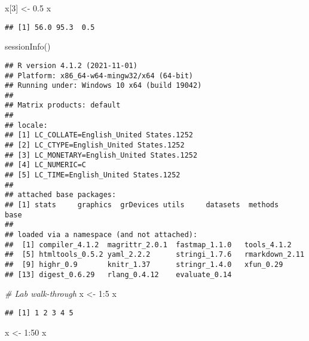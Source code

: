 \documentclass[
]{article}
\newenvironment{Shaded}{\begin{snugshade}}{\end{snugshade}}
\newcommand{\CommentTok}[1]{\textcolor[rgb]{0.56,0.35,0.01}{\textit{#1}}}
\newcommand{\DecValTok}[1]{\textcolor[rgb]{0.00,0.00,0.81}{#1}}
\newcommand{\FloatTok}[1]{\textcolor[rgb]{0.00,0.00,0.81}{#1}}
\newcommand{\FunctionTok}[1]{\textcolor[rgb]{0.00,0.00,0.00}{#1}}
\newcommand{\NormalTok}[1]{#1}
\newcommand{\OtherTok}[1]{\textcolor[rgb]{0.56,0.35,0.01}{#1}}
\newcommand{\SpecialCharTok}[1]{\textcolor[rgb]{0.00,0.00,0.00}{#1}}
\begin{document}
\begin{Shaded}
\begin{Highlighting}[]
\NormalTok{x[}\DecValTok{3}\NormalTok{] }\OtherTok{\textless{}{-}} \FloatTok{0.5}
\NormalTok{x}
\end{Highlighting}
\end{Shaded}

\begin{verbatim}
## [1] 56.0 95.3  0.5
\end{verbatim}

\begin{Shaded}
\begin{Highlighting}[]
\FunctionTok{sessionInfo}\NormalTok{()}
\end{Highlighting}
\end{Shaded}

\begin{verbatim}
## R version 4.1.2 (2021-11-01)
## Platform: x86_64-w64-mingw32/x64 (64-bit)
## Running under: Windows 10 x64 (build 19042)
## 
## Matrix products: default
## 
## locale:
## [1] LC_COLLATE=English_United States.1252 
## [2] LC_CTYPE=English_United States.1252   
## [3] LC_MONETARY=English_United States.1252
## [4] LC_NUMERIC=C                          
## [5] LC_TIME=English_United States.1252    
## 
## attached base packages:
## [1] stats     graphics  grDevices utils     datasets  methods   base     
## 
## loaded via a namespace (and not attached):
##  [1] compiler_4.1.2  magrittr_2.0.1  fastmap_1.1.0   tools_4.1.2    
##  [5] htmltools_0.5.2 yaml_2.2.2      stringi_1.7.6   rmarkdown_2.11 
##  [9] highr_0.9       knitr_1.37      stringr_1.4.0   xfun_0.29      
## [13] digest_0.6.29   rlang_0.4.12    evaluate_0.14
\end{verbatim}

\begin{Shaded}
\begin{Highlighting}[]
\CommentTok{\# Lab walk{-}through}
\NormalTok{x }\OtherTok{\textless{}{-}} \DecValTok{1}\SpecialCharTok{:}\DecValTok{5}
\NormalTok{x}
\end{Highlighting}
\end{Shaded}

\begin{verbatim}
## [1] 1 2 3 4 5
\end{verbatim}

\begin{Shaded}
\begin{Highlighting}[]
\NormalTok{x }\OtherTok{\textless{}{-}} \DecValTok{1}\SpecialCharTok{:}\DecValTok{50}
\NormalTok{x}
\end{Highlighting}
\end{Shaded}
\end{document}
